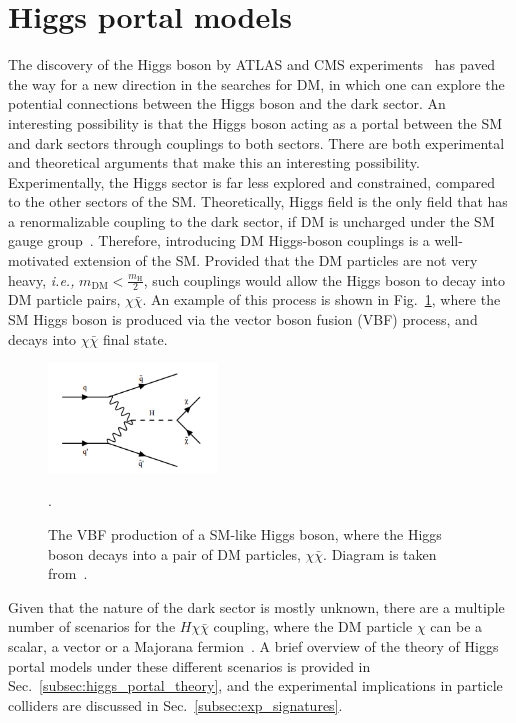 \section{Higgs portal models}

\graphicspath{{1_TheoreticalBackground/Figures/HiggsPortal}}

The discovery of the Higgs boson by ATLAS and CMS experiments~\cite{Nisati:2015iwc} has paved the way for a new direction
in the searches for DM, in which one can explore the potential connections between the Higgs boson and the dark sector.
An interesting possibility is that the Higgs boson acting as a portal between the SM and dark sectors through
couplings to both sectors. There are both experimental and theoretical arguments that make this an interesting possibility.
Experimentally, the Higgs sector is far less explored and constrained, compared to the other sectors of the SM. Theoretically,
Higgs field is the only field that has a renormalizable
coupling to the dark sector, if DM is uncharged under the SM gauge group~\cite{Argyropoulos:2021sav}. Therefore, introducing 
DM Higgs-boson couplings is a well-motivated extension of the SM. Provided that the DM particles are not very heavy,
\textit{i.e.,} $m_{\textrm{DM}} < \frac{m_{\textrm{H}}}{2}$, such couplings would allow the Higgs boson to decay into DM particle
pairs, $\chi \bar{\chi}$. An example of this process is shown in Fig.~\ref{fig:vbfhinv_signal_diag}, where the SM Higgs boson
is produced via the vector boson fusion (VBF) process, and decays into $\chi\bar{\chi}$ final state.

\begin{figure}[htbp]
    \centering
    \includegraphics[width=0.4\textwidth]{vbf_signal_diagram.png}
    \caption{The VBF production of a SM-like Higgs boson, where the Higgs boson decays into a pair of DM particles, $\chi\bar{\chi}$.
    Diagram is taken from~\cite{VBFHinvAnalysisPaper}.}.
    \label{fig:vbfhinv_signal_diag}
\end{figure}

Given that the nature of the dark sector is mostly unknown, there are a multiple number of scenarios for the $H \chi \bar{\chi}$ coupling,
where the DM particle $\chi$ can be a scalar, a vector or a Majorana fermion~\cite{Djouadi:2011aa}. A brief overview of the 
theory of Higgs portal models under these different scenarios is provided in Sec.~\ref{subsec:higgs_portal_theory}, and the experimental
implications in particle colliders are discussed in Sec.~\ref{subsec:exp_signatures}.

